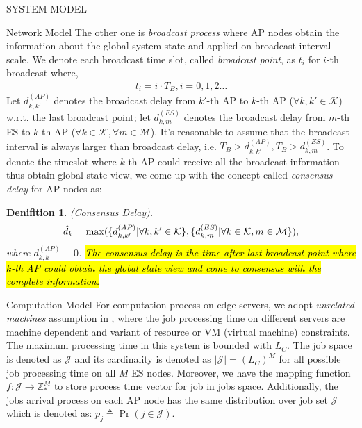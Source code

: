 \documentclass[10pt, conference, letterpaper]{IEEEtran}
\newtheorem{definition}{Denifition}
\newcommand{\domZ}{\mathbb{Z}_{*}}
\newcommand{\define}{\triangleq}
\DeclarePairedDelimiter{\set}{\{}{\}}
\newcommand{\apSet}{\mathcal{K}}
\newcommand{\esSet}{\mathcal{M}}
\newcommand{\jSet}{\mathcal{J}}
\begin{document}
\begin{section}{SYSTEM MODEL}
\begin{subsection}{Network Model}
            The other one is \emph{broadcast process} where AP nodes obtain the information about the global system state and applied on broadcast interval scale. We denote each broadcast time slot, called \emph{broadcast point}, as $t_i$ for $i$-th broadcast where,
            \begin{align}
                t_i = i \cdot T_B, i=0,1,2\dots
            \end{align} 
            Let $d^{(AP)}_{k,k'}$ denotes the broadcast delay from $k'$-th AP to $k$-th AP ($\forall k,k'\in\apSet$) w.r.t. the last broadcast point; let $d^{(ES)}_{k,m}$ denotes the broadcast delay from $m$-th ES to $k$-th AP ($\forall k\in\apSet,\forall m\in\esSet$). It's reasonable to assume that the broadcast interval is always larger than broadcast delay, i.e. $T_B > d^{(AP)}_{k,k'}, T_B > d^{(ES)}_{k,m}$. To denote the timeslot where $k$-th AP could receive all the broadcast information thus obtain global state view, we come up with the concept called \emph{consensus delay} for AP nodes as:
            \begin{definition}
                (Consensus Delay).
                \begin{align}
                    \hat{d}_k = \max(\set{d^{(AP)}_{k,k'}|\forall k,k'\in\apSet}, \set{d^{(ES)}_{k,m}|\forall k\in\apSet,m\in\esSet}),
                \end{align}
                where $d^{(AP)}_{k,k} \equiv 0$. \hl{The consensus delay is the time after last broadcast point where $k$-th AP could obtain the global state view and come to consensus with the complete information.}
            \end{definition}
        \end{subsection}

        \begin{subsection}{Computation Model}
            For computation process on edge servers, we adopt \emph{unrelated machines} assumption in \cite{tan-online}, where the job processing time on different servers are machine dependent and variant of resource or VM (virtual machine) constraints.
            The maximum processing time in this system is bounded with $L_C$.
            The job space is denoted as $\jSet$ and its cardinality is denoted as $|\jSet|=(L_C)^M$ for all possible job processing time on all $M$ ES nodes.
            Moreover, we have the mapping function $f:\jSet \to \domZ^M$ to store process time vector for job in jobs space.
            Additionally, the jobs arrival process on each AP node has the same distribution over job set $\jSet$ which is denoted as: $p_j \define \Pr(j\in\jSet)$.
            

\end{subsection}
\end{section}
\end{document}
